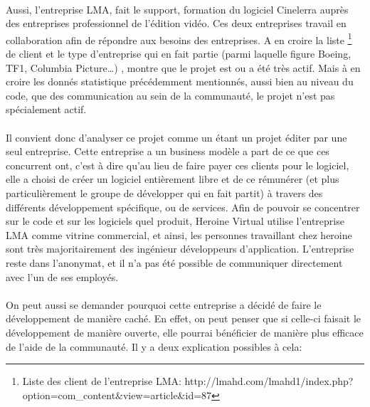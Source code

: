 \paragraph{}

Aussi, l'entreprise LMA, fait le support, formation du
logiciel Cinelerra auprès des entreprises professionnel
de l'édition vidéo. Ces deux entreprises travail en
collaboration afin de répondre aux besoins des entreprises. A
en croire la liste \footnote{Liste des client de l'entreprise LMA:
  http://lmahd.com/lmahd1/index.php?option=com\_content\&view=article\&id=87}
de client et le type d'entreprise qui en fait partie (parmi laquelle
figure Boeing, TF1, Columbia Picture\ldots) , montre que le projet
est ou a été très actif. Mais à en croire les donnés statistique
précédemment mentionnés, aussi bien au niveau du code, que des
communication au sein de la communauté, le projet n'est pas spécialement
actif.

\paragraph{}

Il convient donc d'analyser ce projet comme un étant un projet éditer
par une seul entreprise. Cette entreprise a un business modèle a part
de ce que ces concurrent ont, c'est à dire qu'au lieu de faire payer ces
clients pour le logiciel, elle a choisi de créer un logiciel entièrement
libre et de ce rémunérer (et plus particulièrement le groupe de
développer qui en fait partit) à travers des différents développement
spécifique, ou de services.  Afin de pouvoir se concentrer sur le code
et sur les logiciels quel produit, Heroine Virtual utilise l'entreprise
LMA comme vitrine commercial, et ainsi, les personnes travaillant chez
heroine sont très majoritairement des ingénieur développeurs d'application.
L'entreprise reste dans l'anonymat, et il n'a pas été possible de communiquer
directement avec l'un de ses employés.

\paragraph{}

On peut aussi se demander pourquoi cette entreprise a décidé de faire
le développement de manière caché. En effet, on peut penser que si
celle-ci faisait le développement de manière ouverte, elle pourrai
bénéficier de manière plus efficace de l'aide de la communauté. Il
y a deux  explication possibles à cela:

